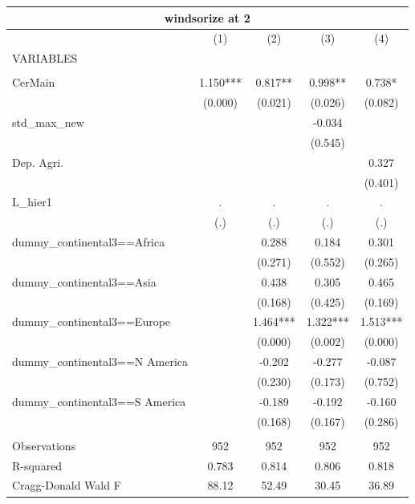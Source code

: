 \documentclass[12pt,a4paper]{article}
\begin{document}
\begin{tabular}{lcccc}
\multicolumn{5}{c}{windsorize at 2} \\ \hline
 & (1) & (2) & (3) & (4) \\
VARIABLES &  &  &  &  \\ \hline
 &  &  &  &  \\
CerMain & 1.150*** & 0.817** & 0.998** & 0.738* \\
 & (0.000) & (0.021) & (0.026) & (0.082) \\
std\_max\_new &  &  & -0.034 &  \\
 &  &  & (0.545) &  \\
Dep. Agri. &  &  &  & 0.327 \\
 &  &  &  & (0.401) \\
L\_hier1 & . & . & . & . \\
 & (.) & (.) & (.) & (.) \\
dummy\_continental3==Africa &  & 0.288 & 0.184 & 0.301 \\
 &  & (0.271) & (0.552) & (0.265) \\
dummy\_continental3==Asia &  & 0.438 & 0.305 & 0.465 \\
 &  & (0.168) & (0.425) & (0.169) \\
dummy\_continental3==Europe &  & 1.464*** & 1.322*** & 1.513*** \\
 &  & (0.000) & (0.002) & (0.000) \\
dummy\_continental3==N America &  & -0.202 & -0.277 & -0.087 \\
 &  & (0.230) & (0.173) & (0.752) \\
dummy\_continental3==S America &  & -0.189 & -0.192 & -0.160 \\
 &  & (0.168) & (0.167) & (0.286) \\
 &  &  &  &  \\
Observations & 952 & 952 & 952 & 952 \\
R-squared & 0.783 & 0.814 & 0.806 & 0.818 \\
 Cragg-Donald Wald F & 88.12 & 52.49 & 30.45 & 36.89 \\ \hline
\end{tabular}
\end{document}
